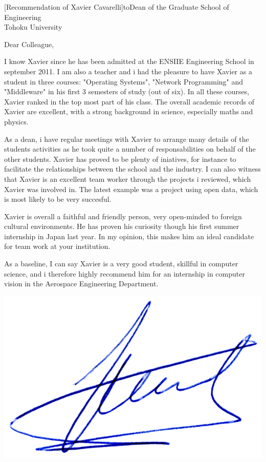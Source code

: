 \documentclass[a4paper,10pt]{article}
\begin{document}

\begin{letter}[Recommendation of Xavier Cavarelli]{to}{Dean of the Graduate School of Engineering\\%
Tohoku University}

Dear Colleague, 

I know Xavier since he has been admitted at the ENSIIE Engineering School in september 2011.
I am also a teacher and i had the pleasure to have Xavier as a student in three courses: 
"Operating Systems", "Network Programming" and "Middleware" in his first 3 semesters of 
study (out of six). In all these courses, Xavier ranked in the top most part of his class.
The overall academic records of Xavier are excellent, with a strong background in science,
especially maths and physics.


As a dean, i have regular meetings with Xavier to arrange many details of the students 
activities as he took quite a number of responsabilities on behalf of the other students.
Xavier has proved to be plenty of iniatives, for instance to facilitate the relationships
between the school and the industry. I can also witness that Xavier is an excellent team worker
through the projects i reviewed, which Xavier was involved in. The latest example was 
a project using open data, which is most likely to be very succesful.


Xavier is overall a faithful and friendly person, very open-minded to foreign cultural 
environments. He has proven his curiosity though his first summer internship in Japan last
year. In my opinion, this makes him an ideal candidate for team work at your institution.


As a baseline, I can say Xavier is a very good student, skillful in computer science,
and i therefore highly recommend  him for an internship in computer vision in the Aerospace 
Engineering Department.

\end{letter}
\begin{flushright}
\includegraphics[width=.26\textwidth]{signgenaud.jpg}
\end{flushright}
%
%
\end{document}
